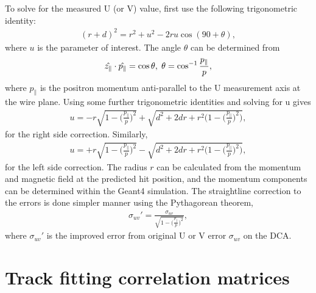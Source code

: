 To solve for the measured U (or V) value, first use the following trigonometric identity:
	\begin{align}
		(r+d)^{2} = r^{2}+u^{2}-2ru\cos(90+\theta),
	\end{align}
where $u$ is the parameter of interest. The angle $\theta$ can be determined from 
	\begin{align}
		\hat{z_{\parallel}} \cdot \hat{p_{\parallel}} = \cos{\theta}, \hspace{.1cm} \theta = \cos^{-1}{\frac{p_{\parallel}}{p}}, 
	\end{align}
where $p_{\parallel}$ is the positron momentum anti-parallel to the U measurement axis at the wire plane. Using some further trigonometric identities and solving for u gives
	\begin{align}
		u = -r\sqrt{1-\Big(\frac{p_{\parallel}}{p}\Big)^{2}} + \sqrt{d^{2} + 2dr + r^{2}\Big(1-\Big(\frac{p_{\parallel}}{p}\Big)^{2}\Big)},
	\end{align}
for the right side correction. Similarly,  
	\begin{align}
		u = +r\sqrt{1-\Big(\frac{p_{\parallel}}{p}\Big)^{2}} - \sqrt{d^{2} + 2dr + r^{2}\Big(1-\Big(\frac{p_{\parallel}}{p}\Big)^{2}\Big)},
	\end{align}
for the left side correction. The radius $r$ can be calculated from the momentum and magnetic field at the predicted hit position, and the momentum components can be determined within the Geant4 simulation. The straightline correction to the errors is done simpler manner using the Pythagorean theorem, 
	\begin{align}
		\sigma_{uv}' = \frac{\sigma_{uv}}{\sqrt{1-\big(\frac{p_{\parallel}}{p}\big)^{2}}},
	\end{align}
where $\sigma_{uv}'$ is the improved error from original U or V error $\sigma_{uv}$ on the DCA.



\section{Track fitting correlation matrices}
\label{app:trackingCorrMatrices}


